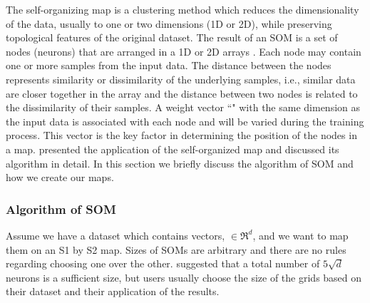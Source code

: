  The self-organizing map is a clustering method which reduces the dimensionality of the data, usually to one or two dimensions (1D or 2D), while preserving topological features of the original dataset.
 The result of an SOM is a set of nodes (neurons) that are arranged in a 1D or 2D arrays \citep{Kohonen98}. 
 Each node may contain one or more samples from the input data.
 The distance between the nodes represents similarity or dissimilarity of the underlying samples, i.e., similar data are closer together in the array and the distance between two nodes is related to the dissimilarity of their samples.
 A weight vector ``" with the same dimension as the input data is associated with each node and will be varied during the training process.
 This vector is the key factor in determining the position of the nodes in a map.
 \cite{Geach12} presented the application of the self-organized map and discussed its algorithm in detail.
 In this section we briefly discuss the algorithm of SOM and how we create our maps. 
 
 \subsubsection{Algorithm of SOM} 
 \label{sec: algorithm}
     Assume we have a dataset which contains vectors,  $\in \Re^d$, and we want to map them on an S1 by S2 map. 
     Sizes of SOMs are arbitrary and there are no rules regarding choosing one over the other. 
    \citet{Vesanto05} suggested that a total number of $5\sqrt{d}$ neurons is a sufficient size, but users usually choose the size of the grids based on their dataset and their application of the results.

